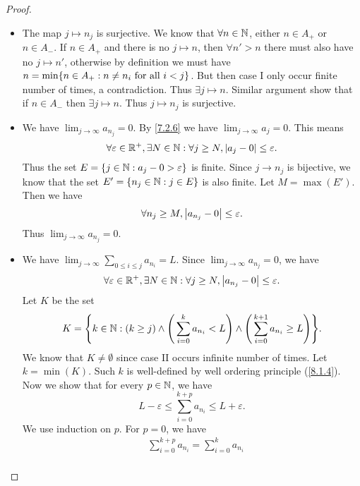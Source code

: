 \begin{proof}
\begin{itemize}
		      But this means \(\sum_{n \in A_-} a_n\) is absolutely convergent, a contradiction.
		      Thus case I occurs infinite number of times.
		      Similar proof show that case II also occurs infinite number of times.
		\item The map \(j \mapsto n_j\) is surjective.
		      We know that \(\forall n \in \mathbb{N}\), either \(n \in A_+\) or \(n \in A_-\).
		      If \(n \in A_+\) and there is no \(j \mapsto n\), then \(\forall n' > n\) there must also have no \(j \mapsto n'\), otherwise by definition we must have \(n = \min\set{n \in A_+ : n \neq n_i \text{ for all } i < j}\).
		      But then case I only occur finite number of times, a contradiction.
		      Thus \(\exists j \mapsto n\).
		      Similar argument show that if \(n \in A_-\) then \(\exists j \mapsto n\).
		      Thus \(j \mapsto n_j\) is surjective.
		\item We have \(\lim_{j \to \infty} a_{n_j} = 0\).
		      By \cref{7.2.6} we have \(\lim_{j \to \infty} a_j = 0\).
		      This means
		      \[
			      \forall \varepsilon \in \mathbb{R}^+, \exists N \in \mathbb{N} : \forall j \geq N, \left\lvert a_j - 0\right\rvert \leq \varepsilon.
		      \]
		      Thus the set \(E = \left\lbrace j \in \mathbb{N} : a_j - 0 > \varepsilon\right\rbrace\) is finite.
		      Since \(j \to n_j\) is bijective, we know that the set \(E' = \left\lbrace n_j \in \mathbb{N} : j \in E\right\rbrace\) is also finite.
		      Let \(M = \max(E')\).
		      Then we have
		      \[
			      \forall n_j \geq M, \left\lvert a_{n_j} - 0\right\rvert \leq \varepsilon.
		      \]
		      Thus \(\lim_{j \to \infty} a_{n_j} = 0\).
		\item We have \(\lim_{j \to \infty} \sum_{0 \leq i \leq j} a_{n_i} = L\).
		      Since \(\lim_{j \to \infty} a_{n_j} = 0\), we have
		      \[
			      \forall \varepsilon \in \mathbb{R}^+, \exists N \in \mathbb{N} : \forall j \geq N, \left\lvert a_{n_j} - 0\right\rvert \leq \varepsilon.
		      \]
		      Let \(K\) be the set
		      \[
			      K = \set{k \in \N : (k \geq j) \land \Bigg(\sum_{i = 0}^k a_{n_i} < L\Bigg) \land \Bigg(\sum_{i = 0}^{k + 1} a_{n_i} \geq L\Bigg)}.
		      \]
		      We know that \(K \neq \emptyset\) since case II occurs infinite number of times.
		      Let \(k = \min(K)\).
		      Such \(k\) is well-defined by well ordering principle (\cref{8.1.4}).
		      Now we show that for every \(p \in \mathbb{N}\), we have
		      \[
			      L - \varepsilon \leq \sum_{i = 0}^{k + p} a_{n_i} \leq L + \varepsilon.
		      \]
		      We use induction on \(p\).
		      For \(p = 0\), we have
		      \begin{align*}
			               & \sum_{i = 0}^{k + p} a_{n_i} = \sum_{i = 0}^k a_{n_i}                                                                                                \\

\end{align*}
\end{itemize}
\end{proof}
